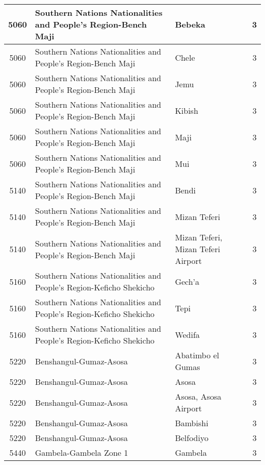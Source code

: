 \documentclass[12pt,a4paper]{report}
\begin{document}
\begin{tabular}{|c|l|l|c|}
\hline 
\rule[-1ex]{0pt}{2.5ex} 5060 & Southern Nations Nationalities and People's Region-Bench Maji & Bebeka & 3 \\
\hline 
\rule[-1ex]{0pt}{2.5ex} 5060 & Southern Nations Nationalities and People's Region-Bench Maji & Chele & 3 \\
\hline 
\rule[-1ex]{0pt}{2.5ex} 5060 & Southern Nations Nationalities and People's Region-Bench Maji & Jemu & 3 \\
\hline 
\rule[-1ex]{0pt}{2.5ex} 5060 & Southern Nations Nationalities and People's Region-Bench Maji & Kibish & 3 \\
\hline 
\rule[-1ex]{0pt}{2.5ex} 5060 & Southern Nations Nationalities and People's Region-Bench Maji & Maji & 3 \\
\hline 
\rule[-1ex]{0pt}{2.5ex} 5060 & Southern Nations Nationalities and People's Region-Bench Maji & Mui & 3 \\
\hline 
\rule[-1ex]{0pt}{2.5ex} 5140 & Southern Nations Nationalities and People's Region-Bench Maji & Bendi & 3 \\
\hline 
\rule[-1ex]{0pt}{2.5ex} 5140 & Southern Nations Nationalities and People's Region-Bench Maji & Mizan Teferi & 3 \\
\hline 
\rule[-1ex]{0pt}{2.5ex} 5140 & Southern Nations Nationalities and People's Region-Bench Maji & Mizan Teferi, Mizan Teferi Airport & 3 \\
\hline 
\rule[-1ex]{0pt}{2.5ex} 5160 & Southern Nations Nationalities and People's Region-Keficho Shekicho & Gech'a & 3 \\
\hline 
\rule[-1ex]{0pt}{2.5ex} 5160 & Southern Nations Nationalities and People's Region-Keficho Shekicho & Tepi & 3 \\
\hline 
\rule[-1ex]{0pt}{2.5ex} 5160 & Southern Nations Nationalities and People's Region-Keficho Shekicho & Wedifa & 3 \\
\hline 
\rule[-1ex]{0pt}{2.5ex} 5220 & Benshangul-Gumaz-Asosa & Abatimbo el Gumas & 3 \\
\hline 
\rule[-1ex]{0pt}{2.5ex} 5220 & Benshangul-Gumaz-Asosa & Asosa & 3 \\
\hline 
\rule[-1ex]{0pt}{2.5ex} 5220 & Benshangul-Gumaz-Asosa & Asosa, Asosa Airport & 3 \\
\hline 
\rule[-1ex]{0pt}{2.5ex} 5220 & Benshangul-Gumaz-Asosa & Bambishi & 3 \\
\hline 
\rule[-1ex]{0pt}{2.5ex} 5220 & Benshangul-Gumaz-Asosa & Belfodiyo & 3 \\
\hline 
\rule[-1ex]{0pt}{2.5ex} 5440 & Gambela-Gambela Zone 1 & Gambela & 3 \\

\end{tabular}
\end{document}

